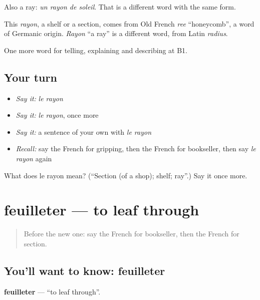 Also a ray: \emph{un rayon de soleil}. That is a different word with the same form.

\begin{cousinweb}
This \emph{rayon}, a shelf or a section, comes from Old French \emph{ree} \textquotedblleft{}honeycomb\textquotedblright{}, a word of Germanic origin. \emph{Rayon} \textquotedblleft{}a ray\textquotedblright{} is a different word, from Latin \emph{radius}.
\end{cousinweb}

\begin{grammarlens}[title={What you've built}]
One more word for telling, explaining and describing at B1.
\end{grammarlens}

\subsection*{Your turn}
\begin{itemize}
\raggedright
  \item \emph{Say it:} \emph{le rayon}
  \item \emph{Say it:} \emph{le rayon}, once more
  \item \emph{Say it:} a sentence of your own with \emph{le rayon}
  \item \emph{Recall:} say the French for gripping, then the French for bookseller, then say \emph{le rayon} again
\end{itemize}

\begin{tcolorbox}[breakable,colback=teal!4,colframe=teal!35!black,title={Before you move on}]
What does le rayon mean? (\textquotedblleft{}Section (of a shop); shelf; ray\textquotedblright{}.) Say it once more.
\end{tcolorbox}
\section[feuilleter]{feuilleter — to leaf through}

\label{lesson:FR-C520-feuilleter}



\begin{quote}
Before the new one: say the French for bookseller, then the French for section.
\end{quote}

\subsection*{You'll want to know: feuilleter}
\textbf{feuilleter} — \textquotedblleft{}to leaf through\textquotedblright{}.

